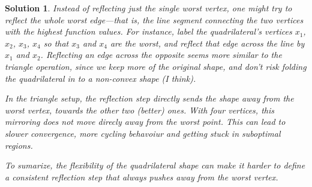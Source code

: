 \documentclass[a4paper,12pt]{article}
\theoremstyle{breaktheorem}
\theoremstyle{exerciseStyle}
\theoremstyle{solutionStyle}
\newtheorem{solution}{Solution}[section]
\begin{document}
\begin{solution}
Instead of reflecting just the single worst vertex, one might try to reflect the whole worst edge—that is,
 the line segment connecting the two vertices with the highest function values. 
 For instance, label the quadrilateral’s vertices \(x_1\), \(x_2\), \(x_3\), \(x_4\) 
 so that \(x_3\) and \(x_4\) are the worst, and reflect that edge across the line by \(x_1\) and \(x_2\).  
Reflecting an edge across the opposite seems more similar to the triangle operation, since we keep
more of the original shape, and don't risk folding the quadrilateral in to a non-convex shape (I think).

In the triangle setup, the reflection step \emph{directly} sends the shape away from the worst vertex, towards the other two (better) ones. 
With four vertices, this mirroring does not move direcly away from the worst point.
This can lead to slower convergence, more cycling behavoiur and getting stuck in suboptimal regions.

To sumarize, the flexibility of the quadrilateral shape can make it harder to define a consistent reflection step that always pushes away from the worst vertex.
\end{solution}
    
\end{document}
